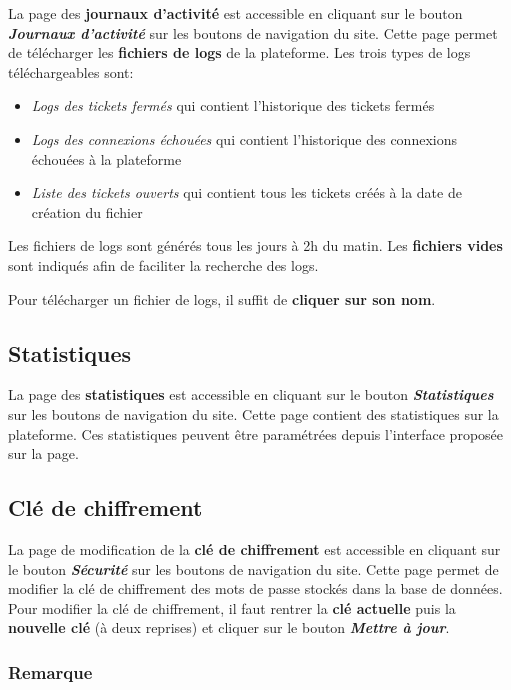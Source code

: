 \documentclass[12pt, a4paper]{article}
\begin{document}
La page des \textbf{journaux d'activité} est accessible en cliquant sur le bouton \textit{\textbf{Journaux d'activité}} sur les boutons de navigation du site.
Cette page permet de télécharger les \textbf{fichiers de logs} de la plateforme.
Les trois types de logs téléchargeables sont:

\begin{itemize}
    \item \textit{Logs des tickets fermés} qui contient l'historique des tickets fermés
    \item \textit{Logs des connexions échouées} qui contient l'historique des connexions échouées à la plateforme
    \item \textit{Liste des tickets ouverts} qui contient tous les tickets créés à la date de création du fichier
\end{itemize}

\bigskip
\noindent Les fichiers de logs sont générés tous les jours à 2h du matin.
Les \textbf{fichiers vides} sont indiqués afin de faciliter la recherche des logs.

\bigskip
\noindent Pour télécharger un fichier de logs, il suffit de \textbf{cliquer sur son nom}.

\subsection*{Statistiques}

La page des \textbf{statistiques} est accessible en cliquant sur le bouton \textit{\textbf{Statistiques}} sur les boutons de navigation du site.
Cette page contient des statistiques sur la plateforme. Ces statistiques peuvent être paramétrées depuis l'interface proposée sur la page.

\subsection*{Clé de chiffrement}

La page de modification de la \textbf{clé de chiffrement} est accessible en cliquant sur le bouton \textit{\textbf{Sécurité}} sur les boutons de navigation du site.
Cette page permet de modifier la clé de chiffrement des mots de passe stockés dans la base de données.
Pour modifier la clé de chiffrement, il faut rentrer la \textbf{clé actuelle} puis la \textbf{nouvelle clé} (à deux reprises) et cliquer sur le bouton \textit{\textbf{Mettre à jour}}.

\subsubsection*{Remarque}
\end{document}
